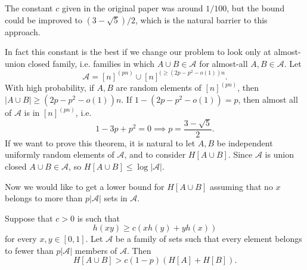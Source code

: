 \documentclass[12pt]{article}
\begin{document}
The constant $c$ given in the original paper was around $1/100$, but the bound could be improved to $(3 - \sqrt 5)/2$, which is the natural barrier to this approach.

In fact this constant is the best if we change our problem to look only at almost-union closed family, i.e. families in which $A \cup B \in \mathcal{A}$ for almost-all $A, B \in \mathcal{A}$. Let
\[
	\mathcal{A} = [n]^{(pn)} \cup [n]^{(\geq (2p - p^2 - o(1))n}.
\]
With high probability, if $A, B$ are random elements of $[n]^{(pn)}$, then $|A \cup B| \geq (2p - p^2 - o(1))n$. If $1 - (2p - p^2 - o(1)) = p$, then almost all of $\mathcal{A}$ is in $[n]^{(pn)}$, i.e.
\[
1 - 3p + p^2 = 0 \implies p = \frac{3 - \sqrt 5}{2}.
\]
If we want to prove this theorem, it is natural to let $A, B$ be independent uniformly random elements of $\mathcal{A}$, and to consider $H[A \cup B]$. Since $\mathcal{A}$ is union closed $A \cup B \in \mathcal{A}$, so $H[A \cup B] \leq \log |\mathcal{A}|$.

Now we would like to get a lower bound for $H[A \cup B]$ assuming that no $x$ belongs to more than $p|\mathcal{A}|$ sets in $\mathcal{A}$.


\begin{lemma}
	Suppose that $c > 0$ is such that
	\[
	h(xy) \geq c (x h(y) + y h(x))
	\]
	for every $x, y \in [0, 1]$. Let $\mathcal{A}$ be a family of sets such that every element belongs to fewer than $p|\mathcal{A}|$ members of $\mathcal{A}$. Then
	\[
		H[A \cup B] > c(1 - p) (H[A] + H[B]).
	\]
\end{lemma}
\end{document}
